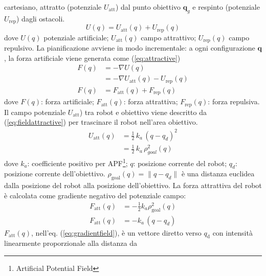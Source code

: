 cartesiano, attratto (potenziale $U_{\text{att}}$) dal punto obiettivo 
$\mathbf{q}_g$ e respinto (potenziale $U_{\text{rep}}$) dagli ostacoli.
\begin{equation}
\label{eq:apfm}
U(q) = U_{\text{att}}(q) + U_{\text{rep}}(q)
\end{equation}
%
\noindent dove $U(q)$ potenziale artificiale; $U_{\text{att}}(q)$ campo 
attrattivo; $U_{\text{rep}}(q)$ campo repulsivo.
La pianificazione avviene in modo incrementale: a ogni configurazione 
$\mathbf{q}$, la forza artificiale viene generata come (\ref{eq:attractive})
\begin{equation}
\label{eq:attractive}
\begin{split}
F(q) &= - \nabla U(q)\\
&= - \nabla U_{\text{att}}(q) -U_{\text{rep}}(q)\\
F(q) &= F_{\text{att}}(q) + F_{\text{rep}}(q)	
\end{split}
\end{equation}
dove $F(q)$: forza artificiale; $F_{\text{att}}(q)$: forza attrattiva; 
$F_{\text{rep}}(q)$: forza repulsiva. Il campo potenziale $U_{\text{att}}$) tra 
robot e obiettivo viene descritto da (\ref{eq:fieldattractive}) per trascinare 
il robot nell'area obiettivo.
\begin{equation}
\label{eq:fieldattractive}
\begin{split}
U_{\text{att}}(q) &= \frac{1}{2} \, k_a \, (q-q_d)^2\\
&= \frac{1}{2} \, k_a \, \rho^{2}_{goal}(q)
\end{split}
\end{equation}
dove $k_a$: coefficiente positivo per APF\footnote{Artificial Potential Field};
$q$: posizione corrente del robot; $q_{d}$: posizione corrente dell'obiettivo.
$\rho_{\text{goal}}(q) = \|q-q_{d}\|$ è una distanza euclidea dalla posizione 
del robot alla posizione dell'obiettivo. La forza attrattiva del robot è 
calcolata come gradiente negativo del potenziale campo\cite{6283526}:
\begin{equation}
\label{eq:gradientfield}
\begin{split}
F_{\text{att}}(q) &= -\frac{1}{2}k_a \rho^2_{\text{goal}}(q)\\
F_{\text{att}}(q) &= -k_a \, (q-q_d)
\end{split}
\end{equation}
%
$F_{\text{att}}(q)$, nell'eq. (\ref{eq:gradientfield}), è un vettore diretto 
verso $q_{\text{d}}$ con intensità linearmente proporzionale alla distanza da 
